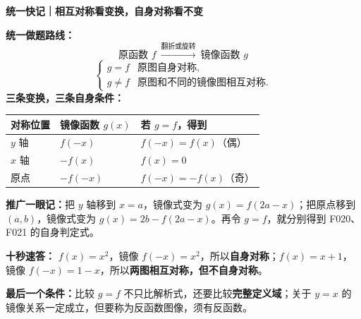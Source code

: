 \clearpage
\begin{summarybox}
\textbf{统一快记｜相互对称看变换，自身对称看不变}

\textbf{统一做题路线：}
\[
\boxed{\text{原函数 }f\ \xrightarrow{\text{翻折或旋转}}\ \text{镜像函数 }g}
\]
\[
\begin{cases}
 g=f & \text{原图自身对称},\\
 g\ne f & \text{原图和不同的镜像图相互对称}.
\end{cases}
\]
\textbf{三条变换，三条自身条件：}
\begin{center}\renewcommand{\arraystretch}{1.43}
\begin{tabular}{p{.20\linewidth}|p{.32\linewidth}|p{.30\linewidth}}
对称位置 & 镜像函数 $g(x)$ & 若 $g=f$，得到\\\hline
$y$ 轴 & $f(-x)$ & $f(-x)=f(x)$（偶）\\
$x$ 轴 & $-f(x)$ & $f(x)=0$\\
原点 & $-f(-x)$ & $f(-x)=-f(x)$（奇）
\end{tabular}\end{center}
\textbf{推广一眼记：}把 $y$ 轴移到 $x=a$，镜像式变为 $g(x)=f(2a-x)$；把原点移到 $(a,b)$，镜像式变为 $g(x)=2b-f(2a-x)$。再令 $g=f$，就分别得到 F020、F021 的自身判定式。

\textbf{十秒速答：} $f(x)=x^2$，镜像 $f(-x)=x^2$，所以\textbf{自身对称}；$f(x)=x+1$，镜像 $f(-x)=1-x$，所以\textbf{两图相互对称，但不自身对称}。

\textbf{最后一个条件：}比较 $g=f$ 不只比解析式，还要比较\textbf{完整定义域}；关于 $y=x$ 的镜像关系一定成立，但要称为反函数图像，须有反函数。
\end{summarybox}


